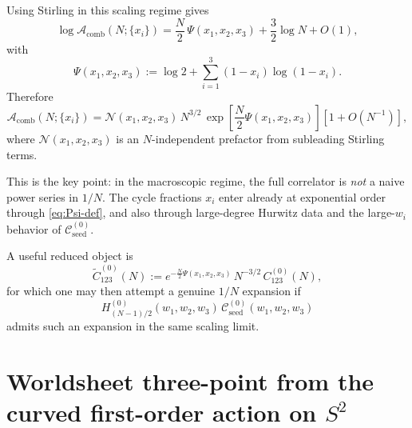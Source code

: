\documentclass[11pt]{article}
\newcommand{\mc}[1]{\mathcal{#1}}
\begin{document}
Using Stirling in this scaling regime gives
\begin{equation}\label{eq:Acomb-stirling}
\log \mc A_{\mathrm{comb}}(N;\{x_i\})
=
\frac{N}{2}\,\Psi(x_1,x_2,x_3)
+\frac{3}{2}\log N
+O(1),
\end{equation}
with
\begin{equation}\label{eq:Psi-def}
\Psi(x_1,x_2,x_3)
:=
\log 2+\sum_{i=1}^3 (1-x_i)\log(1-x_i).
\end{equation}
Therefore
\begin{equation}\label{eq:Acomb-asymptotic}
\mc A_{\mathrm{comb}}(N;\{x_i\})
=
\mc N(x_1,x_2,x_3)\,
N^{3/2}\,
\exp\!\left[\frac{N}{2}\Psi(x_1,x_2,x_3)\right]
\left[1+O(N^{-1})\right],
\end{equation}
where $\mc N(x_1,x_2,x_3)$ is an $N$-independent prefactor from subleading Stirling terms.

This is the key point: in the macroscopic regime, the full correlator is \emph{not} a naive power series in $1/N$. The cycle fractions $x_i$ enter already at exponential order through \eqref{eq:Psi-def}, and also through large-degree Hurwitz data and the large-$w_i$ behavior of $\mc C_{\mathrm{seed}}^{(0)}$.

A useful reduced object is
\begin{equation}\label{eq:reduced-amplitude}
\widetilde C_{123}^{(0)}(N)
:=
e^{-\frac{N}{2}\Psi(x_1,x_2,x_3)}\,N^{-3/2}\,C_{123}^{(0)}(N),
\end{equation}
for which one may then attempt a genuine $1/N$ expansion if
\begin{equation}
H_{(N-1)/2}^{(0)}(w_1,w_2,w_3)\,
\mc C_{\mathrm{seed}}^{(0)}(w_1,w_2,w_3)
\end{equation}
admits such an expansion in the same scaling limit.

\section{Worldsheet three-point from the curved first-order action on \texorpdfstring{$S^2$}{S2}}
\end{document}
